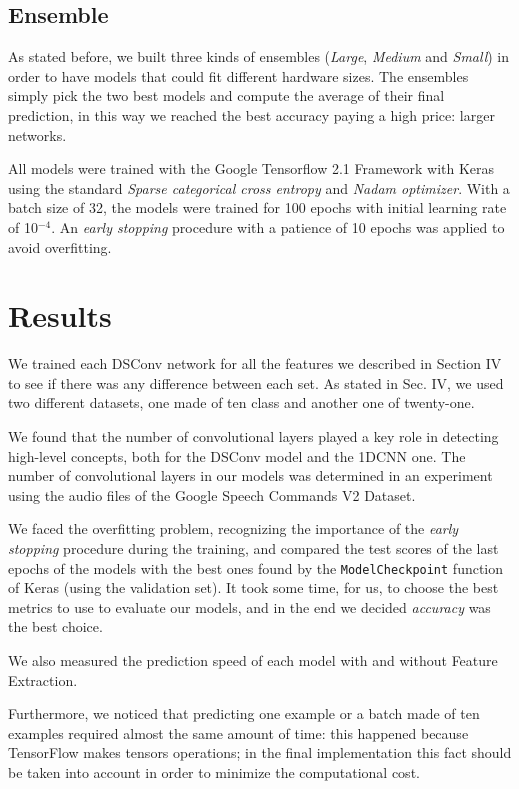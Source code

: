 \documentclass[conference]{IEEEtran}
\begin{document}
\subsection{Ensemble}
As stated before, we built three kinds of ensembles (\textit{Large}, \textit{Medium} and \textit{Small}) in order to have models that could fit different hardware sizes. The ensembles simply pick the two best models and compute the average of their final prediction, in this way we reached the best accuracy paying a high price: larger networks.

All models were trained with the Google Tensorflow 2.1 Framework with Keras using the standard \textit{Sparse categorical cross entropy} and \textit{Nadam optimizer}. With a batch size of 32,
the models were trained for 100 epochs with initial learning rate of 10$^{-4}$. An \textit{early stopping} procedure with a patience of 10 epochs was applied to avoid overfitting.

\section{Results}
We trained each DSConv network for all the features we described in Section IV to see if there was any difference between each set. As stated in Sec. IV, we used two different datasets, one made of ten class and another one of twenty-one.

We found that the number of convolutional layers played a key role in detecting high-level concepts, both for the DSConv model and the 1DCNN one. The number of convolutional layers in our models was determined in an experiment using the audio files of the Google Speech Commands V2 Dataset.

We faced the overfitting problem, recognizing the importance of the \textit{early stopping} procedure during the training, and compared the test scores of the last epochs of the models with the best ones found by the \texttt{ModelCheckpoint} function of Keras (using the validation set).
It took some time, for us, to choose the best metrics to use to evaluate our models, and in the end we decided \textit{accuracy} was the best choice.

We also measured the prediction speed of each model with and without Feature Extraction. 

Furthermore, we noticed that predicting one example or a batch made of ten examples required almost the same amount of time: this happened because TensorFlow makes tensors operations; in the final implementation this fact should be taken into account in order to minimize the computational cost.
\end{document}
